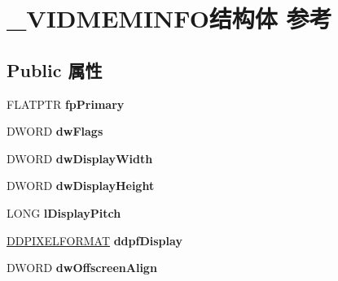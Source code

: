 \hypertarget{struct___v_i_d_m_e_m_i_n_f_o}{}\section{\+\_\+\+V\+I\+D\+M\+E\+M\+I\+N\+F\+O结构体 参考}
\label{struct___v_i_d_m_e_m_i_n_f_o}
\subsection*{Public 属性}
\begin{DoxyCompactItemize}
\item 
\mbox{\label{struct___v_i_d_m_e_m_i_n_f_o_ab52c978f6a249617742c0fe904ba44e2}} 
F\+L\+A\+T\+P\+TR {\bfseries fp\+Primary}
\item 
\mbox{\label{struct___v_i_d_m_e_m_i_n_f_o_a86d30b5a1955bce3943c78eeba8cf406}} 
D\+W\+O\+RD {\bfseries dw\+Flags}
\item 
\mbox{\label{struct___v_i_d_m_e_m_i_n_f_o_a6ab5789c63ce1fae8a8cdbf9865e3ff1}} 
D\+W\+O\+RD {\bfseries dw\+Display\+Width}
\item 
\mbox{\label{struct___v_i_d_m_e_m_i_n_f_o_ac7daac377280854eb8a29293f6e8fc28}} 
D\+W\+O\+RD {\bfseries dw\+Display\+Height}
\item 
\mbox{\label{struct___v_i_d_m_e_m_i_n_f_o_a0a2d083d76d2d48859778a7240d37a8f}} 
L\+O\+NG {\bfseries l\+Display\+Pitch}
\item 
\mbox{\label{struct___v_i_d_m_e_m_i_n_f_o_ab4aee09b47790c08eed8d85e2bbf09aa}} 
\hyperlink{struct___d_d_p_i_x_e_l_f_o_r_m_a_t}{D\+D\+P\+I\+X\+E\+L\+F\+O\+R\+M\+AT} {\bfseries ddpf\+Display}
\item 
\mbox{\label{struct___v_i_d_m_e_m_i_n_f_o_acf8f234e076080511003280245f45f32}} 
D\+W\+O\+RD {\bfseries dw\+Offscreen\+Align}
\item 
\mbox{\label{struct___v_i_d_m_e_m_i_n_f_o_ada15dbc910ca29ac46fe74bf0dad40b0}} 

\end{DoxyCompactItemize}
